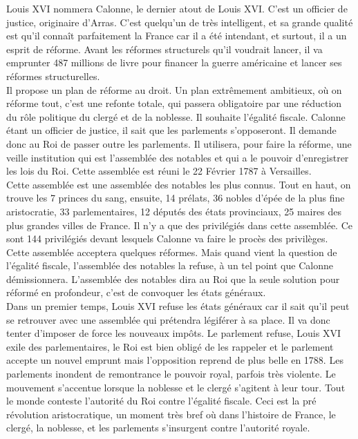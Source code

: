 \documentclass[10pt, a4paper, openany]{book}
\begin{document}
Louis XVI nommera Calonne, le dernier atout de Louis XVI. C'est un officier de justice, originaire d'Arras. C'est quelqu'un de très intelligent, et sa grande qualité est qu'il connaît parfaitement la France car il a été intendant, et surtout, il a un esprit de réforme. Avant les réformes structurels qu'il voudrait lancer, il va emprunter 487 millions de livre pour financer la guerre américaine et lancer ses réformes structurelles. \\
Il propose un plan de réforme au droit. Un plan extrêmement ambitieux, où on réforme tout, c'est une refonte totale, qui passera obligatoire par une réduction du rôle politique du clergé et de la noblesse. Il souhaite l'égalité fiscale. Calonne étant un officier de justice, il sait que les parlements s'opposeront. Il demande donc au Roi de passer outre les parlements. Il utilisera, pour faire la réforme, une veille institution qui est l'assemblée des notables et qui a le pouvoir d'enregistrer les lois du Roi. Cette assemblée est réuni le 22 Février 1787 à Versailles. \\
Cette assemblée est une assemblée des notables les plus connus. Tout en haut, on trouve les 7 princes du sang, ensuite, 14 prélats, 36 nobles d'épée de la plus fine aristocratie, 33 parlementaires, 12 députés des états provinciaux, 25 maires des plus grandes villes de France. Il n'y a que des privilégiés dans cette assemblée. Ce sont 144 privilégiés devant lesquels Calonne va faire le procès des privilèges. \\
Cette assemblée acceptera quelques réformes. Mais quand vient la question de l'égalité fiscale, l'assemblée des notables la refuse, à un tel point que Calonne démissionnera. L'assemblée des notables dira au Roi que la seule solution pour réformé en profondeur, c'est de convoquer les états généraux. \\
Dans un premier temps, Louis XVI refuse les états généraux car il sait qu'il peut se retrouver avec une assemblée qui prétendra légiférer à sa place. Il va donc tenter d'imposer de force les nouveaux impôts. Le parlement refuse, Louis XVI exile des parlementaires, le Roi est bien obligé de les rappeler et le parlement accepte un nouvel emprunt mais l'opposition reprend de plus belle en 1788. Les parlements inondent de remontrance le pouvoir royal, parfois très violente. Le mouvement s'accentue lorsque la noblesse et le clergé s'agitent à leur tour. Tout le monde conteste l'autorité du Roi contre l'égalité fiscale. Ceci est la pré révolution aristocratique, un moment très bref où dans l'histoire de France, le clergé, la noblesse, et les parlements s'insurgent contre l'autorité royale. \\
\end{document}
